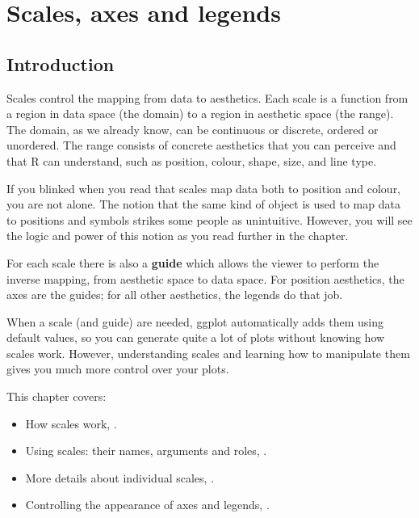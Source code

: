 
\chapter{Scales, axes and legends}
\label{cha:scales}

% 


\section{Introduction}

Scales control the mapping from data to aesthetics. Each scale is a function from a region in data space (the domain) to a region in aesthetic space (the range).  The domain, as we already know, can be continuous or discrete, ordered or unordered.  The range consists of concrete aesthetics that you can perceive and that R can understand, such as position, colour, shape, size, and line type.  

If you blinked when you read that scales map data both to position and colour, you are not alone.  The notion that the same kind of object is used to map data to positions and symbols strikes some people as unintuitive.  However, you will see the logic and power of this notion as you read further in the chapter.

For each scale there is also a {\bf guide} which allows the viewer to perform the inverse mapping, from aesthetic space to data space.  For position aesthetics, the axes are the guides; for all other aesthetics, the legends do that job.

When a scale (and guide) are needed, ggplot automatically adds them using default values, so you can generate quite a lot of plots without knowing how scales work.  However, understanding scales and learning how to manipulate them gives you much more control over your plots.


This chapter covers:

\begin{itemize}
  \item How scales work, .
  \item Using scales: their names, arguments and roles, .
  \item More details about individual scales, .
  \item Controlling the appearance of axes and legends, .
\end{itemize}

